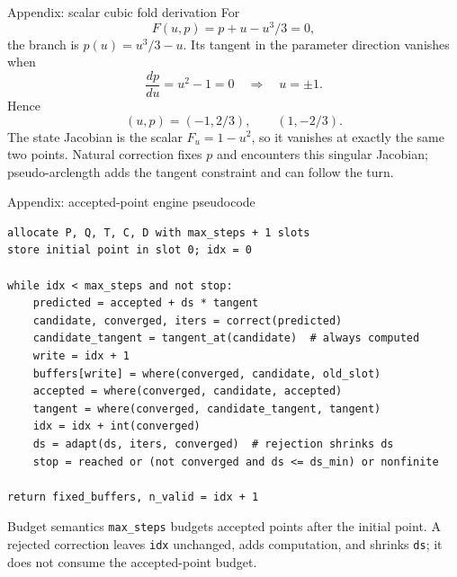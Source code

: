 \begin{frame}{Appendix: scalar cubic fold derivation}
For
\[
F(u,p)=p+u-u^3/3=0,
\]
the branch is $p(u)=u^3/3-u$. Its tangent in the parameter direction vanishes when
\[
\frac{dp}{du}=u^2-1=0
\quad\Longrightarrow\quad u=\pm1.
\]
Hence
\[
(u,p)=(-1,2/3),\qquad(1,-2/3).
\]
The state Jacobian is the scalar $F_u=1-u^2$, so it vanishes at exactly the
same two points. Natural correction fixes $p$ and encounters this singular
Jacobian; pseudo-arclength adds the tangent constraint and can follow the turn.
\end{frame}

\begin{frame}[fragile]{Appendix: accepted-point engine pseudocode}
\begin{lstlisting}
allocate P, Q, T, C, D with max_steps + 1 slots
store initial point in slot 0; idx = 0

while idx < max_steps and not stop:
    predicted = accepted + ds * tangent
    candidate, converged, iters = correct(predicted)
    candidate_tangent = tangent_at(candidate)  # always computed
    write = idx + 1
    buffers[write] = where(converged, candidate, old_slot)
    accepted = where(converged, candidate, accepted)
    tangent = where(converged, candidate_tangent, tangent)
    idx = idx + int(converged)
    ds = adapt(ds, iters, converged)  # rejection shrinks ds
    stop = reached or (not converged and ds <= ds_min) or nonfinite

return fixed_buffers, n_valid = idx + 1
\end{lstlisting}
\begin{alertblock}{Budget semantics}
\texttt{max\_steps} budgets accepted points after the initial point.
A rejected correction leaves \texttt{idx} unchanged, adds computation, and
shrinks \texttt{ds}; it does not consume the accepted-point budget.
\end{alertblock}
\end{frame}


